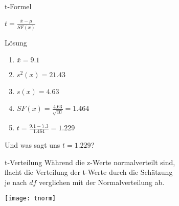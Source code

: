 \begin{frame}
  {t-Formel}
  \begin{center}
    \alert{$t=\frac{\bar{x}-\mu}{SF(x)}$}
  \end{center}
  \vspace{1cm}
\end{frame}

\begin{frame}
  {Lösung}
  \begin{enumerate}[<+->]
    \item $\bar{x}=9.1$
    \item $s^2(x)=21.43$
    \item $s(x)=4.63$
    \item $SF(x)=\frac{4.63}{\sqrt{10}}=1.464$
    \item $t=\frac{9.1-7.3}{1.464}=1.229$
  \end{enumerate}
  \pause
  \begin{center}
    \alert{Und was sagt uns $t=1.229$?}
  \end{center}
\end{frame}

\begin{frame}
  {t-Verteilung}
    Während die z-Werte normalverteilt sind,\\
    flacht die Verteilung der t-Werte durch die Schätzung\\
    je nach $df$ verglichen mit der Normalverteilung ab.\\
    \vspace{-0.5cm}
    \begin{center}
      \texttt{[image: tnorm]}
    \end{center}
\end{frame}


